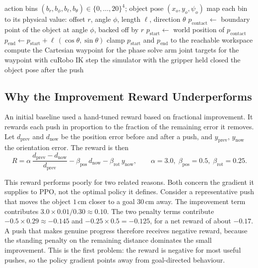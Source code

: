 \begin{algorithm}[H]
\caption{Decode and execute one object-relative push primitive.}
\label{alg:primitive}
\begin{algorithmic}[1]
\Require action bins $(b_r, b_\phi, b_\ell, b_\theta) \in \{0, \dots, 20\}^4$; object pose $(x_o, y_o, \psi_o)$
\State map each bin to its physical value: offset $r$, angle $\phi$, length $\ell$, direction $\theta$
\State $p_{\text{contact}} \gets$ boundary point of the object at angle $\phi$, backed off by $r$
\State $p_{\text{start}} \gets$ world position of $p_{\text{contact}}$
\State $p_{\text{end}} \gets p_{\text{start}} + \ell\,(\cos\theta, \sin\theta)$
\State clamp $p_{\text{start}}$ and $p_{\text{end}}$ to the reachable workspace
    \State compute the Cartesian waypoint for the phase
    \State solve arm joint targets for the waypoint with cuRobo IK
    \State step the simulator with the gripper held closed
\EndFor
\State \Return the object pose after the push
\end{algorithmic}
\end{algorithm}

\subsection{Why the Improvement Reward Underperforms}
\label{sec:frac_reward}

An initial baseline used a hand-tuned reward based on fractional improvement. It
rewards each push in proportion to the fraction of the remaining error it removes.
Let $d_{\text{prev}}$ and $d_{\text{now}}$ be the position error before and after
a push, and $y_{\text{prev}}$, $y_{\text{now}}$ the orientation error. The reward
is then
\begin{equation}
    R = \alpha\,\frac{d_{\text{prev}} - d_{\text{now}}}{d_{\text{prev}}}
        - \beta_{\text{pos}}\, d_{\text{now}}
        - \beta_{\text{rot}}\, y_{\text{now}},
    \qquad \alpha = 3.0,\; \beta_{\text{pos}} = 0.5,\; \beta_{\text{rot}} = 0.25.
    \label{eq:fractional}
\end{equation}

This reward performs poorly for two related reasons. Both concern the gradient it
supplies to PPO, not the optimal policy it defines. Consider a representative push
that moves the object $1\,\text{cm}$ closer to a goal $30\,\text{cm}$ away. The
improvement term contributes $3.0 \times 0.01/0.30 \approx 0.10$. The two penalty
terms contribute $-0.5 \times 0.29 \approx -0.145$ and $-0.25 \times 0.5 =
-0.125$, for a net reward of about $-0.17$. A push that makes genuine progress
therefore receives negative reward, because the standing penalty on the remaining
distance dominates the small improvement. This is the first problem: the reward is
negative for most useful pushes, so the policy gradient points away from
goal-directed behaviour.


